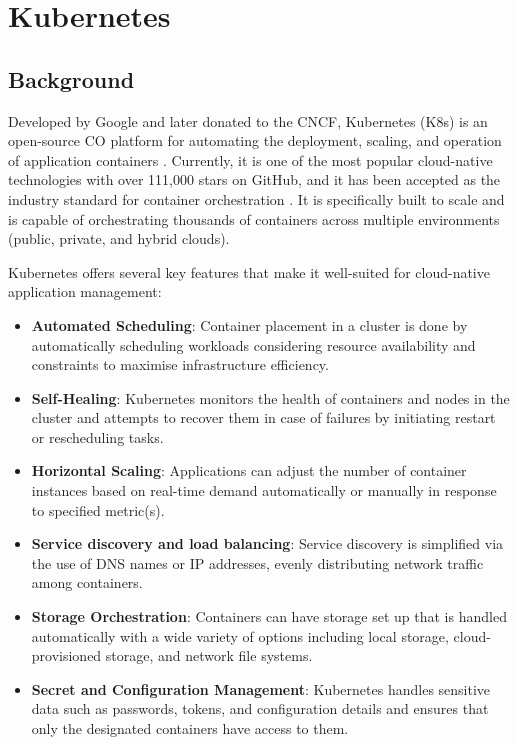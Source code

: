 \section{Kubernetes}\label{kubernetes}
\subsection{Background}

Developed by Google and later donated to the CNCF, Kubernetes (K8s) is an open-source CO platform for automating the deployment, scaling, and operation of application containers \cite{Kubernetes}. Currently, it is one of the most popular cloud-native technologies with over 111,000 stars on GitHub, and it has been accepted as the industry standard for container orchestration \cite{truyenComprehensiveFeatureComparison2019, KubernetesKubernetesProductionGrade}. It is specifically built to scale and is capable of orchestrating thousands of containers across multiple environments (public, private, and hybrid clouds).

Kubernetes offers several key features that make it well-suited for cloud-native application management:

\begin{itemize}

\item \textbf{Automated Scheduling}: Container placement in a cluster is done by automatically scheduling workloads considering resource availability and constraints to maximise infrastructure efficiency. 

\item \textbf{Self-Healing}: Kubernetes monitors the health of containers and nodes in the cluster and attempts to recover them in case of failures by initiating restart or rescheduling tasks.

\item \textbf{Horizontal Scaling}: Applications can adjust the number of container instances based on real-time demand automatically or manually in response to specified metric(s).

\item \textbf{Service discovery and load balancing}: Service discovery is simplified via the use of DNS names or IP addresses, evenly distributing network traffic among containers.

\item \textbf{Storage Orchestration}: Containers can have storage set up that is handled automatically with a wide variety of options including local storage, cloud-provisioned storage, and network file systems.

\item \textbf{Secret and Configuration Management}: Kubernetes handles sensitive data such as passwords, tokens, and configuration details and ensures that only the designated containers have access to them. 

\end{itemize}

